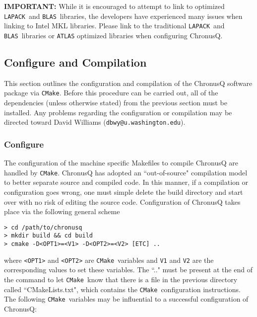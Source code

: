 \documentclass[12pt]{article}
\makeatletter
\newcommand{\DBWYContact}{David Williams (\texttt{dbwy@u.washington.edu})}
\newcommand{\CMake}{\texttt{CMake}}
\newcommand{\LAPACK}{\texttt{LAPACK}}
\newcommand{\BLAS}{\texttt{BLAS}}
\makeatother
\begin{document}
	\noindent \textbf{IMPORTANT:} While it is encouraged to attempt to link to 
	optimized \LAPACK~and \BLAS~libraries, the developers have experienced many 
	issues when linking to Intel MKL libraries. Please link to the traditional 
	\LAPACK~and \BLAS~libraries or \texttt{ATLAS} optimized libraries when 
	configuring ChronusQ.


    \subsection{Configure and Compilation} \label{subsec:ChronusQConfigCompile}
    
    This section outlines the configuration and compilation of the ChronusQ
    software package via \CMake. Before this procedure can be carried out,
    all of the dependencies (unless otherwise stated) from the previous section
    must be installed. Any problems regarding the configuration or compilation
    may be directed toward \DBWYContact.

    \subsubsection{Configure} \label{subsubsec:ChronusQConfig}

    The configuration of the machine specific Makefiles to compile ChronusQ are
    handled by \CMake. ChronusQ has adopted an ``out-of-source" compilation model
    to better separate source and compiled code. In this manner, if a compilation
    or configuration goes wrong, one must simple delete the build directory and 
    start over with no risk of editing the source code. Configuration of ChronusQ
    takes place via the following general scheme
    
    \begin{lstlisting}
> cd /path/to/chronusq
> mkdir build && cd build
> cmake -D<OPT1>=<V1> -D<OPT2>=<V2> [ETC] ..
    \end{lstlisting}

    \noindent where \texttt{<OPT1>} and \texttt{<OPT2>} are \CMake~variables 
    and \texttt{V1} and \texttt{V2} are the corresponding values to set these 
    variables. The ``.." must be present at the end of the command to let 
    \CMake~know that there is a file in the previous directory called 
    ``CMakeLists.txt", which contains the \CMake~configuration instructions. The 
    following \CMake~variables may be influential to a successful configuration of 
    ChronusQ:
\end{document}
